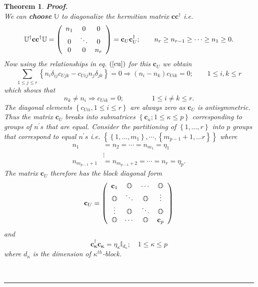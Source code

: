 \documentclass[preprint,aps,showkeys]{revtex4}%
\newtheorem{theorem}{Theorem}
\newenvironment{proof}[1][Proof]{\noindent\textbf{#1.} }{\ \rule{0.5em}{0.5em}}
\begin{document}
\begin{theorem}
\begin{proof}
\begin{equation}
\end{equation}
We can \textbf{choose} $\mathbb{U}$ to diagonalize the hermitian matrix
$\mathbf{cc}^{\dagger}$ i.e.%
\begin{equation}
\mathbb{U}^{\dagger}\mathbf{cc}\mathbb{^{\dagger}U}=\left(
\begin{array}
[c]{ccc}%
n_{1} & 0 & 0\\
0 & \ddots & 0\\
0 & 0 & n_{r}%
\end{array}
\right)  =\mathbf{c}_{U}\mathbf{c}_{U}^{\dagger};\qquad n_{r}\geq n_{r-1}%
\geq\cdots\geq n_{1}\geq0.
\end{equation}
Now using the relationships in eq. $\left(  \ref{cu}\right)  $ for this
$\mathbf{c}_{U}$ we obtain%
\begin{equation}
\sum_{1\leq j\leq r}\left\{  n_{i}\delta_{ij}c_{Ujk}-c_{Uij}n_{j}\delta
_{jk}\right\}  =0\Rightarrow\left(  n_{i}-n_{k}\right)  c_{Uik}=0;\qquad1\leq
i,k\leq r \label{dub1}%
\end{equation}
which shows that
\begin{equation}
n_{k}\neq n_{i}\Rightarrow c_{Uik}=0;\qquad\qquad1\leq i\neq k\leq r.
\end{equation}
The diagonal elements $\left\{  c_{Uii},1\leq i\leq r\right\}  $ are always
zero as $\mathbf{c}_{U}$ is antisymmetric. Thus the matrix $\mathbf{c}_{U}$
breaks into submatrices $\left\{  \mathbf{c}_{\kappa};1\leq\kappa\leq
p\right\}  $ corresponding to groups of $n^{\prime}s$ that are equal. Consider
the partitioning of $\left\{  1,\ldots,r\right\}  $ into $p$ groups that
correspond to equal $n^{\prime}s$ i.e. $\left\{  \left\{  1,\ldots
,m_{1}\right\}  ,\cdots,\left\{  m_{p-1}+1,\ldots r\right\}  \right\}  $
where
\begin{align}
n_{1}  &  =n_{2}=\cdots=n_{m_{1}}=\eta_{1}\nonumber\\
&  \vdots\nonumber\\
n_{m_{p-1}+1}  &  =n_{m_{p-1}+2}=\cdots=n_{r}=\eta_{p}.
\end{align}
The matrix $\mathbf{c}_{U}$ therefore has the block diagonal form
\begin{equation}
\mathbf{c}_{U}=\left(
\begin{array}
[c]{cccc}%
\mathbf{c}_{1} & \mathbb{O} & \cdots & \mathbb{O}\\
\mathbb{O} & \ddots & \mathbb{O} & \vdots\\
\vdots & \mathbb{O} & \ddots & \mathbb{O}\\
\mathbb{O} & \cdots & \mathbb{O} & \mathbf{c}_{p}%
\end{array}
\right)
\end{equation}
and
\begin{equation}
\mathbf{c_{\kappa}^{\dagger}c_{\kappa}}=\eta_{\kappa}\mathbb{I}_{d_{\kappa}%
};\quad1\leq\kappa\leq p \label{dub2}%
\end{equation}
where $d_{\kappa}$ is the dimension of $\kappa^{th}$-block.


\end{proof}
\end{theorem}
\end{document}
